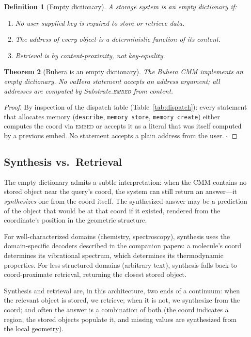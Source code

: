 \documentclass[11pt,twocolumn,a4paper]{article}
\newtheorem{theorem}{Theorem}[section]
\newtheorem{definition}[theorem]{Definition}
\begin{document}
\begin{definition}[Empty dictionary]
A storage system is an \emph{empty dictionary} if:
\begin{enumerate}
\item No user-supplied key is required to store or retrieve data.
\item The address of every object is a deterministic function of its content.
\item Retrieval is by content-proximity, not key-equality.
\end{enumerate}
\end{definition}

\begin{theorem}[Buhera is an empty dictionary]
The Buhera CMM implements an empty dictionary. No vaHera statement accepts an address argument; all addresses are computed by Substrate.\textsc{embed} from content.
\end{theorem}

\begin{proof}
By inspection of the dispatch table (Table~\ref{tab:dispatch}): every statement that allocates memory (\texttt{describe}, \texttt{memory store}, \texttt{memory create}) either computes the coord via \textsc{embed} or accepts it as a literal that was itself computed by a previous embed. No statement accepts a plain address from the user. $\square$
\end{proof}

\subsection{Synthesis vs.\ Retrieval}

The empty dictionary admits a subtle interpretation: when the CMM contains no stored object near the query's coord, the system can still return an answer---it \emph{synthesizes} one from the coord itself. The synthesized answer may be a prediction of the object that would be at that coord if it existed, rendered from the coordinate's position in the geometric structure.

For well-characterized domains (chemistry, spectroscopy), synthesis uses the domain-specific decoders described in the companion papers: a molecule's coord determines its vibrational spectrum, which determines its thermodynamic properties. For less-structured domains (arbitrary text), synthesis falls back to coord-proximate retrieval, returning the closest stored object.

Synthesis and retrieval are, in this architecture, two ends of a continuum: when the relevant object is stored, we retrieve; when it is not, we synthesize from the coord; and often the answer is a combination of both (the coord indicates a region, the stored objects populate it, and missing values are synthesized from the local geometry).
\end{document}

